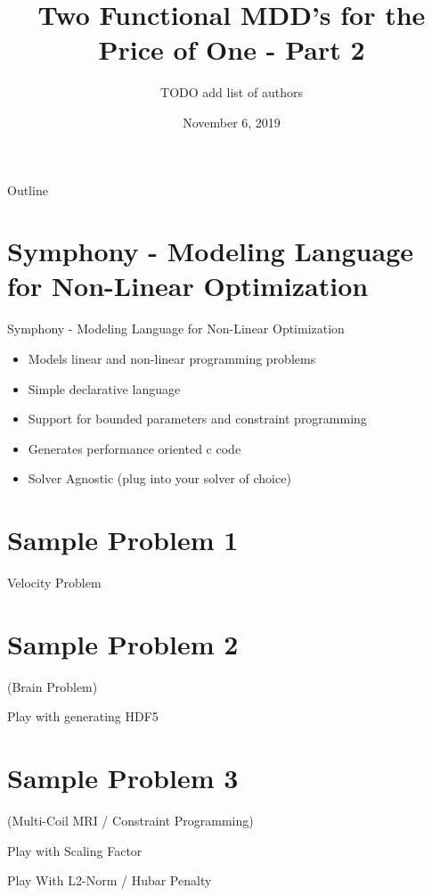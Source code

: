 \documentclass[presentation]{beamer}
\author{TODO add list of authors}
\date{November 6, 2019}
\title{Two Functional MDD's for the Price of One - Part 2}
\begin{document}
\maketitle
\begin{frame}{Outline}
\tableofcontents
\end{frame}


\section{Symphony - Modeling Language for Non-Linear Optimization}
\label{sec:org4936805}
\begin{frame}[label={sec:orgeba1426}]{Symphony - Modeling Language for Non-Linear Optimization}
\begin{itemize}
\item Models linear and non-linear programming problems
\item Simple declarative language
\item Support for bounded parameters and constraint programming
\item Generates performance oriented c code
\item Solver Agnostic (plug into your solver of choice)
\end{itemize}
\end{frame}
\section{Sample Problem 1}
\label{sec:org417e7fd}
\begin{frame}[label={sec:org9a1e969}]{Velocity Problem}
\end{frame}
\section{Sample Problem 2}
\label{sec:org46374ed}
\begin{frame}[label={sec:orga4b6fbf}]{(Brain Problem)}
\end{frame}
\begin{frame}[label={sec:org8845f4f}]{Play with generating HDF5}
\end{frame}
\section{Sample Problem 3}
\label{sec:org53a4a49}
\begin{frame}[label={sec:org2366f94}]{(Multi-Coil MRI / Constraint Programming)}
\end{frame}
\begin{frame}[label={sec:org66b104a}]{Play with Scaling Factor}
\end{frame}
\begin{frame}[label={sec:orga73dd0e}]{Play With L2-Norm / Hubar Penalty}
\end{frame}
\end{document}
